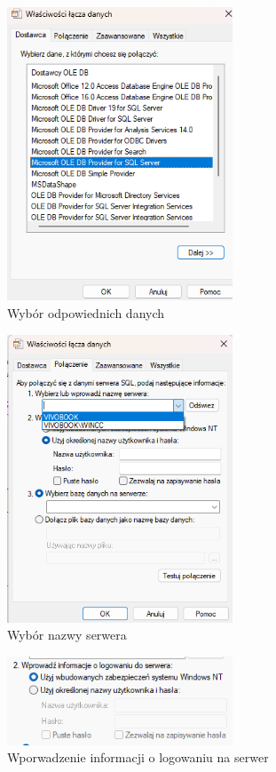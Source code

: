 \documentclass{report}
\begin{document}
\begin{figure}[H]
    \centering
    \includegraphics[width=0.6\textwidth]{src/Database/Stage2.png}
    \caption{Wybór odpowiednich danych}
    \label{fig:first-att}
\end{figure}

\begin{figure}[H]
    \centering
    \includegraphics[width=0.6\textwidth]{src/Database/Stage3.png}
    \caption{Wybór nazwy serwera}
    \label{fig:first-att}
\end{figure}

\begin{figure}[H]
    \centering
    \includegraphics[width=0.6\textwidth]{src/Database/Stage4.png}
    \caption{Wporwadzenie informacji o logowaniu na serwer}
    \label{fig:first-att}
\end{figure}
\end{document}
